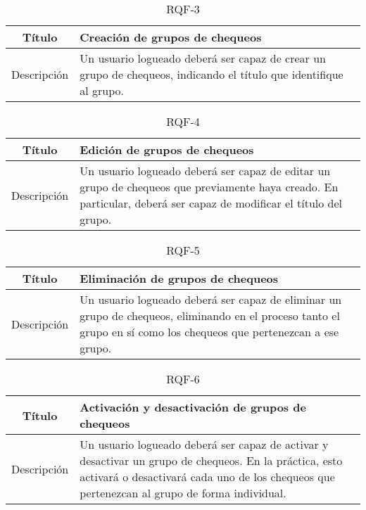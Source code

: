 \begin{table}[h!]
  \centering
  \begin{tabularx}{\textwidth}{|c|X|}
    \hline
    Título & Creación de grupos de chequeos \\

    \hline

    Descripción & Un usuario logueado deberá ser capaz de crear un grupo de
    chequeos, indicando el título que identifique al grupo.\\

    \hline
  \end{tabularx}
  \caption{RQF-3}
\end{table}

\begin{table}[h!]
  \centering
  \begin{tabularx}{\textwidth}{|c|X|}
    \hline
    Título & Edición de grupos de chequeos \\

    \hline

    Descripción & Un usuario logueado deberá ser capaz de editar un grupo de
    chequeos que previamente haya creado. En particular, deberá ser capaz de
    modificar el título del grupo.

    \\

    \hline
  \end{tabularx}
  \caption{RQF-4}
\end{table}

\begin{table}[h!]
  \centering
  \begin{tabularx}{\textwidth}{|c|X|}
    \hline
    Título & Eliminación de grupos de chequeos \\

    \hline

    Descripción & Un usuario logueado deberá ser capaz de eliminar un grupo de
    chequeos, eliminando en el proceso tanto el grupo en sí como los chequeos
    que pertenezcan a ese grupo. \\

    \hline
  \end{tabularx}
  \caption{RQF-5}
\end{table}

\begin{table}[h!]
  \centering
  \begin{tabularx}{\textwidth}{|c|X|}
    \hline
    Título & Activación y desactivación de grupos de chequeos \\

    \hline

    Descripción & Un usuario logueado deberá ser capaz de activar y desactivar
    un grupo de chequeos. En la práctica, esto activará o desactivará cada uno
    de los chequeos que pertenezcan al grupo de forma individual. \\

    \hline
  \end{tabularx}
  \caption{RQF-6}
\end{table}

